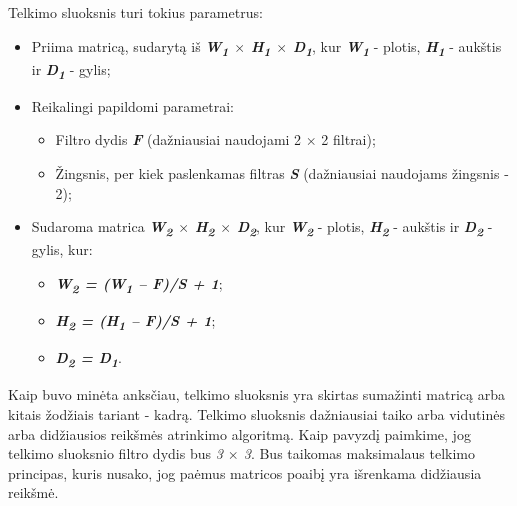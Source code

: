 \documentclass{VUMIFInfKursinis}
\begin{document}
Telkimo sluoksnis turi tokius parametrus:
\begin{itemize}
	\item Priima matricą, sudarytą iš \textit{\textbf{W\textsubscript{1} $\times$ H\textsubscript{1} $\times$ D\textsubscript{1}}}, kur \textit{\textbf{W\textsubscript{1}}} - plotis, \textit{\textbf{H\textsubscript{1}}} - aukštis ir \textit{\textbf{D\textsubscript{1}}} - gylis;
	\item Reikalingi papildomi parametrai:
	\begin{itemize}
		\item Filtro dydis \textbf{\textit{F}} (dažniausiai naudojami 2 $\times$ 2 filtrai);
		\item Žingsnis, per kiek paslenkamas filtras \textbf{\textit{S}} (dažniausiai naudojams žingsnis - 2);
	\end{itemize}
	\item Sudaroma matrica \textit{\textbf{W\textsubscript{2} $\times$ H\textsubscript{2} $\times$ D\textsubscript{2}}}, kur \textit{\textbf{W\textsubscript{2}}} - plotis, \textit{\textbf{H\textsubscript{2}}} - aukštis ir \textit{\textbf{D\textsubscript{2}}} - gylis, kur:
	\begin{itemize}
		\item \textit{\textbf{W\textsubscript{2} = (W\textsubscript{1} – F)/S + 1}};
		\item \textit{\textbf{H\textsubscript{2} = (H\textsubscript{1} – F)/S + 1}};
		\item \textit{\textbf{D\textsubscript{2} = D\textsubscript{1}}}.
	\end{itemize}
\end{itemize}


Kaip buvo minėta anksčiau, telkimo sluoksnis yra skirtas sumažinti matricą arba kitais žodžiais tariant - kadrą. Telkimo sluoksnis dažniausiai taiko arba vidutinės arba didžiausios reikšmės atrinkimo algoritmą. Kaip pavyzdį paimkime, jog telkimo sluoksnio filtro dydis bus \textit{3 $\times$ 3}. Bus taikomas maksimalaus telkimo principas, kuris nusako, jog paėmus matricos poaibį yra išrenkama didžiausia reikšmė.
\end{document}
